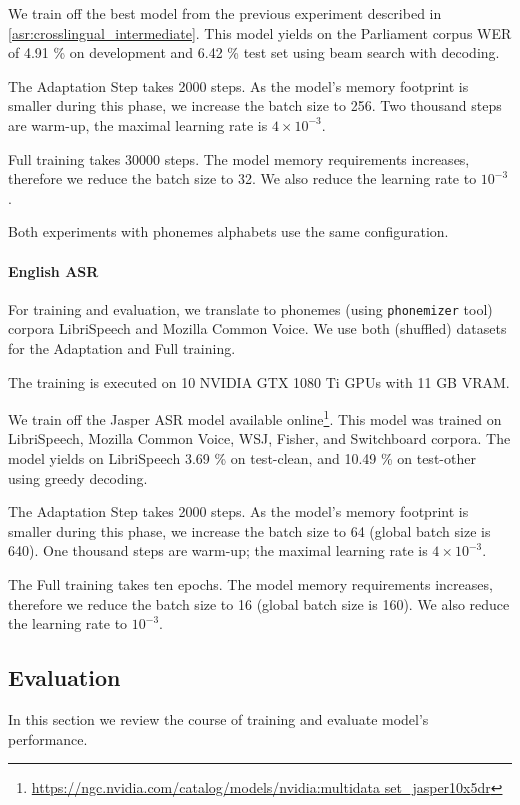 We train off the best model from the previous experiment described in \cref{asr:crosslingual_intermediate}. This model yields on the Parliament corpus WER of 4.91 \% on development and 6.42 \% test set using beam search with decoding.

The Adaptation Step takes 2000 steps. As the model's memory footprint is smaller during this phase, we increase the batch size to 256. Two thousand steps are warm-up, the maximal learning rate is $4 \times 10^{-3}$.

Full training takes 30000 steps. The model memory requirements increases, therefore we reduce the batch size to 32. We also reduce the learning rate to $10^{-3}$.

Both experiments with phonemes alphabets use the same configuration.

\paragraph{English ASR}
For training and evaluation, we translate to phonemes (using \texttt{pho\-ne\-mi\-zer} tool) corpora LibriSpeech and Mozilla Common Voice. We use both (shuffled) datasets for the Adaptation and Full training.

The training is executed on 10 NVIDIA GTX 1080 Ti GPUs with 11 GB VRAM.

We train off the Jasper ASR model available online\footnote{\url{https://ngc.nvidia.com/catalog/models/nvidia:multidata set_jasper10x5dr}}. This model was trained on LibriSpeech, Mozilla Common Voice, WSJ, Fisher, and Switchboard corpora. The model yields on LibriSpeech 3.69 \% on test-clean, and 10.49 \% on test-other using greedy decoding.

The Adaptation Step takes 2000 steps. As the model's memory footprint is smaller during this phase, we increase the batch size to 64 (global batch size is 640). One thousand steps are warm-up; the maximal learning rate is $4 \times 10^{-3}$.

The Full training takes ten epochs. The model memory requirements increases, therefore we reduce the batch size to 16 (global batch size is 160). We also reduce the learning rate to $10^{-3}$.

\subsection{Evaluation}
\label{asr:phon:eval}
In this section we review the course of training and evaluate model's performance.

